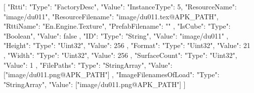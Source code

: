 [{
        "Rtti": {
            "Type": "FactoryDesc",
            "Value": {
                "InstanceType": 5,
                "ResourceName": "image/du011",
                "ResourceFilename": "image/du011.tex@APK_PATH",
                "RttiName": "En.Engine.Texture",
                "PrefabFilename": ""
            }
        },
        "IsCube": {
            "Type": "Boolean",
            "Value": false
        },
        "ID": {
            "Type": "String",
            "Value": "image/du011"
        },
        "Height": {
            "Type": "Uint32",
            "Value": 256
        },
        "Format": {
            "Type": "Uint32",
            "Value": 21
        },
        "Width": {
            "Type": "Uint32",
            "Value": 256
        },
        "SurfaceCount": {
            "Type": "Uint32",
            "Value": 1
        },
        "FilePaths": {
            "Type": "StringArray",
            "Value": ["image/du011.png@APK_PATH"]
        },
        "ImageFilenamesOfLoad": {
            "Type": "StringArray",
            "Value": ["image/du011.png@APK_PATH"]
        }
    }]